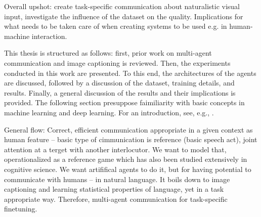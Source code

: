 Overall upshot: create task-specific communication about naturalistic visual input, investigate the influence of the dataset on the quality. Implications for what needs to be taken care of when creating systems to be used e.g. in human-machine interaction. 

This thesis is structured as follows: first, prior work on multi-agent communication and image captioning is reviewed. Then, the experiments conducted in this work are presented. To this end, the architectures of the agents are discussed, followed by a discussion of the dataset, training details, and results. Finally, a general discussion of the results and their implications is provided. The following section presuppose faimiliarity with basic concepts in machine learning and deep learning. For an introduction, see, e.g., \cite{goodfellow2016deep, bishop2006pattern}.



General flow: Correct, efficient communication appropriate in a given context as human feature -- basic type of cimmunication is reference (basic speech act), joint attention at a terget with another interlocutor. We want to model that, operationalized as a reference game which has also been studied extensively in cognitive science. We want artififical agents to do it, but for having potential to communicate with humans -- in natural language. It boils down to image captioning and learning statistical properties of language, yet in a task appropriate way. Therefore, multi-agent communication for task-specific finetuning. 